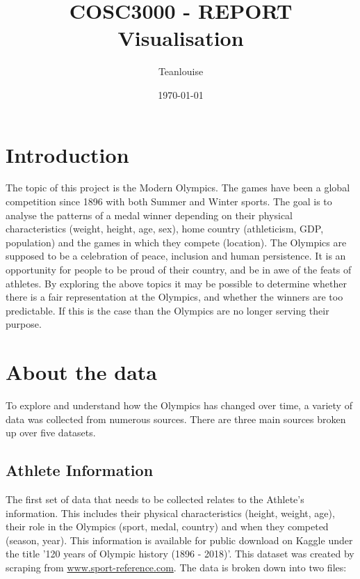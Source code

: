\documentclass[a4 paper, 12pt]{article}
\title{COSC3000 - REPORT \\ Visualisation}
\author{Teanlouise}
\date{\today}
\begin{document}
\maketitle

\pagebreak
\tableofcontents

\pagebreak
\section{Introduction}
The topic of this project is the Modern Olympics. The games have been a global competition since 1896 with both Summer and Winter sports. The goal is to analyse the patterns of a medal winner depending on their physical characteristics (weight, height, age, sex), home country (athleticism, GDP, population) and the games in which they compete (location). The Olympics are supposed to be a celebration of peace, inclusion and human persistence. It is an opportunity for people to be proud of their country, and be in awe of the feats of athletes. By exploring the above topics it may be possible to determine whether there is a fair representation at the Olympics, and whether the winners are too predictable. If this is the case than the Olympics are no longer serving their purpose.

\section{About the data}
To explore and understand how the Olympics has changed over time, a variety of data was collected from numerous sources. There are three main sources broken up over five datasets. 

    \subsection{Athlete Information}
    The first set of data that needs to be collected relates to the Athlete's information. This includes their physical characteristics (height, weight, age), their role in the Olympics (sport, medal, country) and when they competed (season, year). This information is available for public download on Kaggle under the title '120 years of Olympic history (1896 - 2018)'. This dataset was created by scraping from \url{www.sport-reference.com}. The data is broken down into two files:
\end{document}
